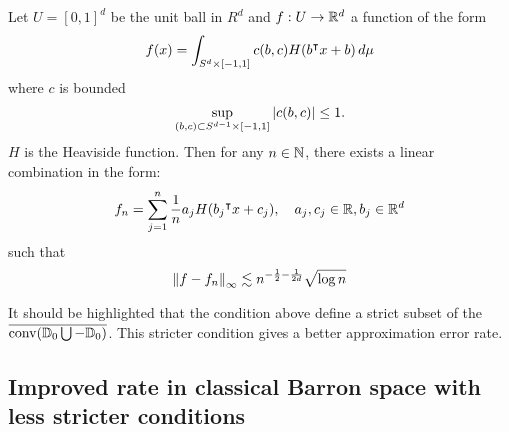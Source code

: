 




\begin{theorem}\cite[Theorem 2, p. 218]{makovozUniformApproximationNeural1998}

    Let $U = [0,1]^d$ be the unit ball in $R^d$ and $f: U \to \mathbb{R}^d$ a function
    of the form
    \begin{equation}
        f(x) = \int_{S^d \times [-1,1]} c(b,c) H(b{}^{\intercal} x + b)\,d\mu
    \end{equation}
    where $c$ is bounded 
    \begin{equation}
        \sup_{(b,c)\subset S^{d-1}\times [-1,1]} \left| c(b,c) \right| \leq 1.
    \end{equation}
    $H$ is the Heaviside function. Then for any $n \in
    \mathbb{N}$, there exists a linear combination in the form:
    \begin{equation}
        \label{eq:fn_Heaviside}
        f_n = \sum_{j=1}^n \frac{1}{n} a_j H(b_j{}^{\intercal} x + c_j), \quad
        a_j,c_j \in\mathbb{R}, b_j \in \mathbb{R}^d
    \end{equation}
    such that
    \begin{equation}
        \left\| f - f_n \right\|_{\infty} \lesssim 
        n^{-\frac{1}{2} - \frac{1}{2d}} \sqrt{\log{n}}
    \end{equation}
\end{theorem}

\begin{remark}
    It should be highlighted that the condition above define a strict subset of
    the $\overline{\operatorname*{conv}({\mathbb{D}_0} \bigcup -{\mathbb{D}_0})}$. This stricter condition gives a
    better approximation error rate.
\end{remark}

\subsection{Improved rate in classical Barron space with less stricter conditions}

